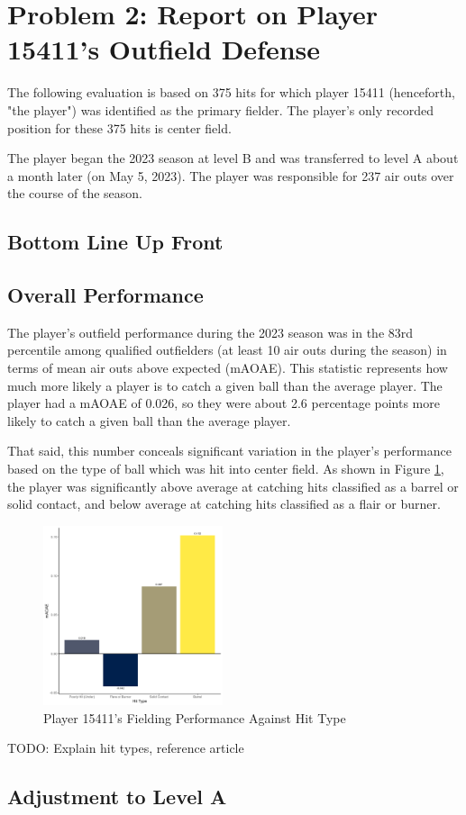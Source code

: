 
\section*{Problem 2: Report on Player 15411's Outfield Defense}
\label{sec:expts}

The following evaluation is based on 375 hits for which player 15411 (henceforth, "the player") was identified as the primary fielder. The player's only recorded position for these 375 hits is center field.

The player began the 2023 season at level B and was transferred to level A about a month later (on May 5, 2023). The player was responsible for 237 air outs over the course of the season.

\subsection{Bottom Line Up Front}

\subsection{Overall Performance}
\label{sec:overallperformance}

The player's outfield performance during the 2023 season was in the 83rd percentile among qualified outfielders (at least 10 air outs during the season) in terms of mean air outs above expected (mAOAE). This statistic represents how much more likely a player is to catch a given ball than the average player. The player had a mAOAE of 0.026, so they were about 2.6 percentage points more likely to catch a given ball than the average player.

That said, this number conceals significant variation in the player's performance based on the type of ball which was hit into center field. As shown in Figure \ref{fig:hittype}, the player was significantly above average at catching hits classified as a barrel or solid contact, and below average at catching hits classified as a flair or burner.

\begin{figure}[htb]
    \includegraphics[width = 0.47\textwidth]{../../output/figs/hit_type_15411.png}
    \caption{Player 15411's Fielding Performance Against Hit Type}
    \label{fig:hittype}
  \end{figure}

  TODO: Explain hit types, reference article

\subsection{Adjustment to Level A}
\label{sec:adjustment}

